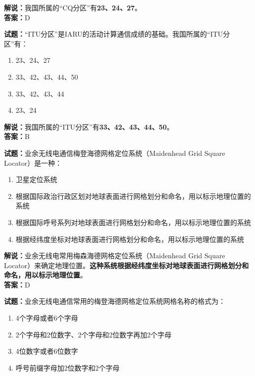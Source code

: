 \documentclass{ctexbook}
\begin{document}
\noindent\textbf{解说：}我国所属的“CQ分区”有\textbf{23、24、27}。\\\noindent\textbf{答案：}D


\bigskip


\noindent\textbf{试题：}“ITU分区”是IARU的活动计算通信成绩的基础。我国所属的“ITU分区”有：

\begin{enumerate}[leftmargin=3em]
	\item 23、24、27
	\item 33、42、43、44、50
	\item 33、42、43、44
	\item 23、24
\end{enumerate}

\noindent\textbf{解说：}我国所属的“ITU分区”有\textbf{33、42、43、44、50}。\\\noindent\textbf{答案：}B


\bigskip


\noindent\textbf{试题：}业余无线电通信梅登海德网格定位系统（Maidenhead Grid Square Locator）是一种：

\begin{enumerate}[leftmargin=3em]
	\item 卫星定位系统
	\item 根据国际政治行政区划对地球表面进行网格划分和命名，用以标示地理位置的系统
	\item 根据国际呼号系列对地球表面进行网格划分和命名，用以标示地理位置的系统
	\item 根据经纬度坐标对地球表面进行网格划分和命名，用以标示地理位置的系统
\end{enumerate}

\noindent\textbf{解说：}业余无线电常用梅森海德网格定位系统（Maidenhead Grid Square Locator）来确定地理位置。\textbf{这种系统根据经纬度坐标对地球表面进行网格划分和命名，用以标示地理位置}。\\\noindent\textbf{答案：}D


\bigskip


\noindent\textbf{试题：}业余无线电通信常用的梅登海德网格定位系统网格名称的格式为：

\begin{enumerate}[leftmargin=3em]
	\item 4个字母或者6个字母
	\item 2个字母和2位数字、2个字母和2位数字再加2个字母
	\item 4位数字或者6位数字
	\item 呼号前缀字母加2位数字和2个字母
\end{enumerate}
\end{document}
